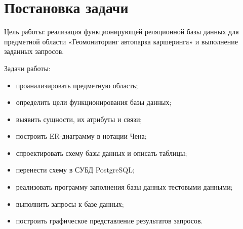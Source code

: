 \section{Постановка задачи}

\noindent Цель работы: реализация функционирующей реляционной базы данных
для предметной области «Геомониторинг автопарка каршеринга» и выполнение заданных запросов.

\noindent Задачи работы:
\begin{itemize}
    \item проанализировать предметную область;
    \item определить цели функционирования базы данных;
    \item выявить сущности, их атрибуты и связи;
    \item построить ER-диаграмму в нотации Чена;
    \item спроектировать схему базы данных и описать таблицы;
    \item перенести схему в СУБД PostgreSQL;
    \item реализовать программу заполнения базы данных тестовыми данными;
    \item выполнить запросы к базе данных;
    \item построить графическое представление результатов запросов.
\end{itemize}
